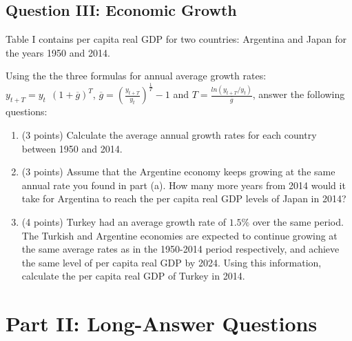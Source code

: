 \documentclass[letterpaper,12pt]{article}
\theoremstyle{dotlessS}
\begin{document}
\subsection*{Question III: Economic Growth}
Table I contains per capita real GDP for two countries: Argentina and Japan for the years 1950 and 2014.  
\begin{table}[H]
\begin{minipage}[h]{1\textwidth}
\centering
\caption*{Table I: Real GDP Per Capita in $\$$US}
\end{minipage} 
\end{table}
\noindent Using the the three formulas for annual average growth rates: $y_{t+T}=y_t \: \: (1+\overline{g})^T$, $\overline{g}=\left(\frac{y_{t+T}}{y_t}\right)^{\frac{1}{T}}-1$ and $T=\frac{ln(y_{t+T}/y_t)}{\overline{g}}$, answer the following questions:
\begin{enumerate}[label=(\alph*)]
\item (3 points) Calculate the average annual growth rates for each country between 1950 and 2014. 
\item (3 points) Assume that the Argentine economy keeps growing at the same annual rate you found in part (a). How many more years from 2014 would it take for Argentina to reach the per capita real GDP levels of Japan in 2014? 
\item (4 points) Turkey had an average growth rate of $1.5\%$ over the same period. The Turkish and Argentine economies are expected to continue growing at the same average rates as in the 1950-2014 period respectively, and achieve the same level of per capita real GDP by 2024. Using this information, calculate the per capita real GDP of Turkey in 2014. 
\end{enumerate}     


\section{Part II: Long-Answer Questions}
\end{document}
